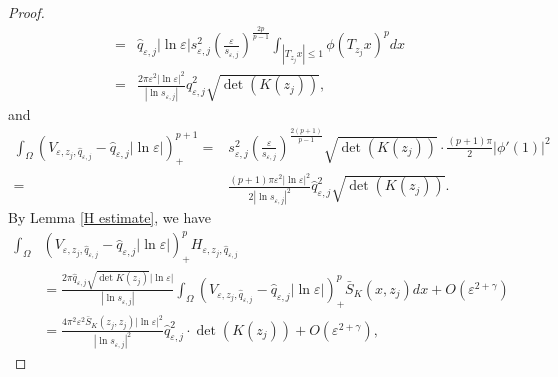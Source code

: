 \documentclass[12pt,reqno]{amsart}
\numberwithin{equation}{section}
\theoremstyle{definition}
\theoremstyle{remark}
\begin{document}
\begin{proof}
\begin{equation*}
\begin{split}
=&\hat{q}_{\varepsilon,j}|\ln\varepsilon| s_{\varepsilon,j}^2\left (\frac{\varepsilon}{s_{\varepsilon,j}}\right )^{\frac{2p}{p-1}}\int_{|T_{z_j}x|\leq 1}\phi\left (T_{z_j}x\right )^pdx\\
=&\frac{2\pi\varepsilon^2|\ln\varepsilon|^2}{|\ln s_{\varepsilon,j}|}\hat{q}_{\varepsilon,j}^2\sqrt{\det(K(z_j))},
\end{split}
\end{equation*}
and
\begin{equation*}
\begin{split}
\int_{\Omega}\left (V_{\varepsilon,z_j,\hat{q}_{\varepsilon,j}}-\hat{q}_{\varepsilon,j}|\ln\varepsilon|\right )^{p+1}_+
=& s_{\varepsilon,j}^2\left( \frac{\varepsilon}{s_{\varepsilon,j}}\right)^{\frac{2(p+1)}{p-1}}\sqrt{\det(K(z_j))}\cdot \frac{(p+1)\pi}{2}|\phi'(1)|^2\\
=&\frac{(p+1)\pi\varepsilon^2|\ln\varepsilon|^2}{2 |\ln s_{\varepsilon,j}|^2}\hat{q}_{\varepsilon,j}^2\sqrt{\det(K(z_j))}.
\end{split}
\end{equation*}
By Lemma \ref{H estimate}, we have
\begin{equation*}
\begin{split}
\int_{\Omega}&\left (V_{\varepsilon,z_j,\hat{q}_{\varepsilon,j}}-\hat{q}_{\varepsilon,j}|\ln\varepsilon|\right )^p_+H_{\varepsilon,z_j,\hat{q}_{\varepsilon,j}}\\
&=\frac{2\pi\hat{q}_{\varepsilon,j}\sqrt{\det K(z_j)}|\ln\varepsilon|}{|\ln  s_{\varepsilon,j}|}\int_{\Omega}\left (V_{\varepsilon,z_j,\hat{q}_{\varepsilon,j}}-\hat{q}_{\varepsilon,j}|\ln\varepsilon|\right )^p_+\bar{S}_K(x,z_j)dx+O\left( \varepsilon^{2+\gamma}\right)  \\
&=\frac{4\pi^2\varepsilon^2 \bar{S}_K(z_j,z_j)|\ln\varepsilon|^2}{|\ln s_{\varepsilon,j}|^2}\hat{q}_{\varepsilon,j}^2\cdot \det(K(z_j))+O\left( \varepsilon^{2+\gamma} \right),

\end{split}
\end{equation*}
\end{proof}
\end{document}
